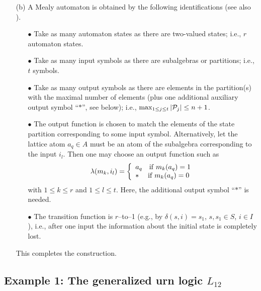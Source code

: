 \begin{itemize}
\begin{itemize}
\item[(b)] A Mealy automaton is obtained by the following identifications
(see also \cite[pp. 154--155]{svozil-93}).
\begin{itemize}
\item[$\bullet$]
Take as many automaton states as there are two-valued states; i.e.,
$r$  automaton states.
\item[$\bullet$]
Take as many input symbols as there are subalgebras or partitions; i.e., $t$ symbols.
\item[$\bullet$]
Take as many output symbols as there are elements in the partition(s) with the maximal number of elements
(plus one additional auxiliary output symbol ``$\ast$'', see below);
i.e., $\max_{1\le j\le t}\vert {\cal P}_j\vert \le n+1$.
\item[$\bullet$]
The output function is chosen to match the elements of the state partition corresponding
to some input symbol.
Alternatively, let the lattice atom $a_q\in A$
must be an atom of the subalgebra corresponding to the input $i_l$.
Then one may choose an output function such as
$$
\lambda (m_k,i_l)= \left\{
\begin{array}{l}
a_q \quad{\rm if }\;m_k (a_q)= 1\\
\ast \; \quad {\rm if }\;m_k (a_q)= 0\\
\end{array}
\right.
$$
with
$1\le k \le r$
and
$1\le l \le t$.
Here, the additional output symbol ``$\ast$'' is needed.

\item[$\bullet$]
The transition function is $r$--to--1 (e.g., by $\delta (s,i)=s_1$, $s,s_1\in S$,
$i\in I$), i.e., after one input the information about the
initial state is completely lost.
\end{itemize}
This completes the construction.
\end{itemize}
\end{itemize}



\subsection{Example 1: The generalized urn logic $L_{12}$}

